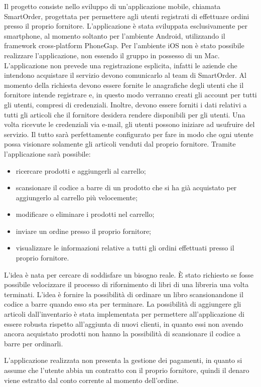 \documentclass[12pt, a4paper, titlepage]{report}
\begin{document}
	Il progetto consiste nello sviluppo di un'applicazione mobile, chiamata SmartOrder, progettata per permettere agli utenti registrati di effettuare ordini presso il proprio fornitore. L'applicazione è stata sviluppata esclusivamente per smartphone, al momento soltanto per l'ambiente Android, utilizzando il framework cross-platform PhoneGap. Per l'ambiente iOS non è stato possibile realizzare l'applicazione, non essendo il gruppo in possesso di un Mac. L'applicazione non prevede una registrazione esplicita, infatti le aziende che intendono acquistare il servizio devono comunicarlo al team di SmartOrder. Al momento della richiesta devono essere fornite le anagrafiche degli utenti che il fornitore intende registrare e, in questo modo verranno creati gli account per tutti gli utenti, compresi di credenziali. Inoltre, devono essere forniti i dati relativi a tutti gli articoli che il fornitore desidera rendere disponibili per gli utenti. Una volta ricevute le credenziali via e-mail, gli utenti possono iniziare ad usufruire del servizio. Il tutto sarà perfettamente configurato per fare in modo che ogni utente possa visionare solamente gli articoli venduti dal proprio fornitore. Tramite l'applicazione sarà possibile:
	\begin{itemize}
		\item ricercare prodotti e aggiungerli al carrello;
		\item scansionare il codice a barre di un prodotto che si ha già acquistato per aggiungerlo al carrello più velocemente;
		\item modificare o eliminare i prodotti nel carrello;
		\item inviare un ordine presso il proprio fornitore;
		\item visualizzare le informazioni relative a tutti gli ordini effettuati presso il proprio fornitore.
	\end{itemize}
	L'idea è nata per cercare di soddisfare un bisogno reale. È stato richiesto se fosse possibile velocizzare il processo di rifornimento di libri di una libreria una volta terminati. L'idea è fornire la possibilità di ordinare un libro scansionandone il codice a barre quando esso sta per terminare. La possibilità di aggiungere gli articoli dall'inventario è stata implementata per permettere all'applicazione di essere robusta rispetto all'aggiunta di nuovi clienti, in quanto essi non avendo ancora acquistato prodotti non hanno la possibilità di scansionare il codice a barre per ordinarli.
	
	L'applicazione realizzata non presenta la gestione dei pagamenti, in quanto si assume che l'utente abbia un contratto con il proprio fornitore, quindi il denaro viene estratto dal conto corrente al momento dell'ordine.
	
\end{document}
